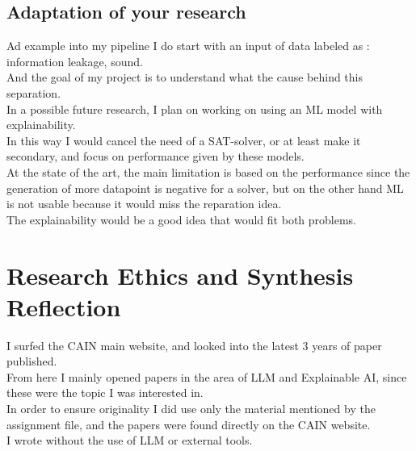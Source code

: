 \documentclass[12pt]{article}
\begin{document}
\subsection{Adaptation of your research}
Ad example into my pipeline I do start with an input of data labeled as : information leakage, sound. \\
And the goal of my project is to understand what the cause behind this separation.\\
In a possible future research, I plan on working on using an ML model with explainability. \\
In this way I would cancel the need of a SAT-solver, or at least make it secondary, and focus on performance given by these models. \\
At the state of the art, the main limitation is based on the performance since the generation of more datapoint is negative for a solver, but on the other hand ML is not usable because it would miss the reparation idea. \\
The explainability would be a good idea that would fit both problems. \\

\section{Research Ethics and Synthesis Reflection}

I surfed the CAIN main website, and looked into the latest 3 years of paper published. \\
From here I mainly opened papers in the area of LLM and Explainable AI, since these were the topic I was interested in. \\
In order to ensure originality I did use only the material mentioned by the assignment file, and the papers were found directly on the CAIN website. \\
I wrote without the use of LLM or external tools. \\
\end{document}
